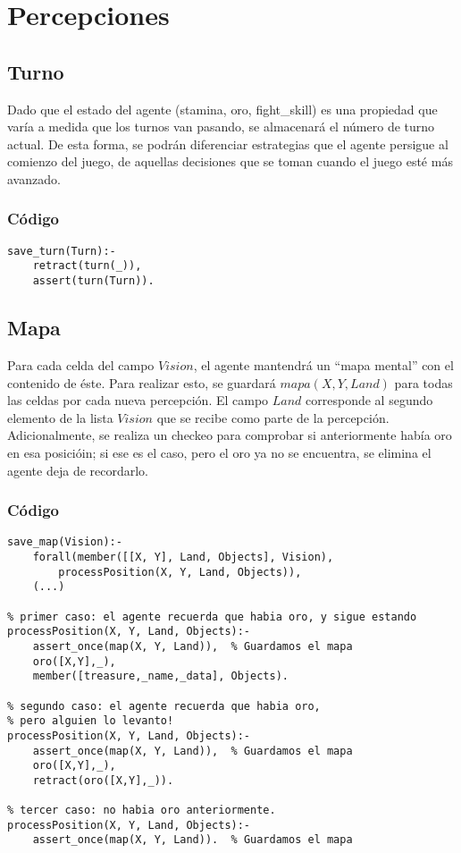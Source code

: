 \documentclass[a4paper,10pt,spanish]{article}
\begin{document}
\section{Percepciones}
	\subsection{Turno}
	
	Dado que el estado del agente (stamina, oro, fight\_skill) es una propiedad que var\'ia a medida que los turnos van pasando, se almacenar\'a el n\'umero de turno actual. De esta forma, se podr\'an diferenciar estrategias que el agente persigue al comienzo del juego, de aquellas decisiones que se toman cuando el juego est\'e m\'as avanzado.
	
		\subsubsection{C\'odigo}
		\begin{lstlisting}
save_turn(Turn):- 
	retract(turn(_)), 
	assert(turn(Turn)).
		\end{lstlisting}

	\subsection{Mapa}
	
	Para cada celda del campo $Vision$, el agente mantendr\'a un ``mapa mental'' con el contenido de \'este. Para realizar esto, se guardar\'a $mapa(X, Y, Land)$ para todas las celdas por cada nueva percepci\'on. El campo $Land$ corresponde al segundo elemento de la lista $Vision$ que se recibe como parte de la percepci\'on. Adicionalmente, se realiza un checkeo para comprobar si anteriormente hab\'ia oro en esa posici\'oin; si ese es el caso, pero el oro ya no se encuentra, se elimina el agente deja de recordarlo.
	
		\subsubsection{C\'odigo}
		\begin{lstlisting}
save_map(Vision):- 
	forall(member([[X, Y], Land, Objects], Vision),
		processPosition(X, Y, Land, Objects)), 
	(...)

% primer caso: el agente recuerda que habia oro, y sigue estando
processPosition(X, Y, Land, Objects):-
	assert_once(map(X, Y, Land)),  % Guardamos el mapa
	oro([X,Y],_),
	member([treasure,_name,_data], Objects).
	
% segundo caso: el agente recuerda que habia oro,
% pero alguien lo levanto!
processPosition(X, Y, Land, Objects):-
	assert_once(map(X, Y, Land)),  % Guardamos el mapa
	oro([X,Y],_),
	retract(oro([X,Y],_)).

% tercer caso: no habia oro anteriormente.
processPosition(X, Y, Land, Objects):-
	assert_once(map(X, Y, Land)).  % Guardamos el mapa

		\end{lstlisting}
	
\end{document}
